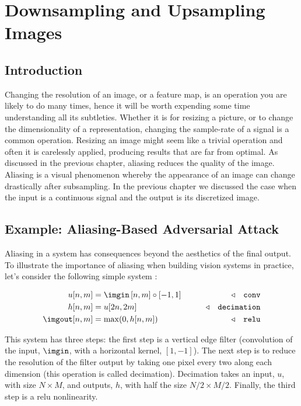 \chapter{Downsampling and Upsampling Images}
\label{chap:downsampling_and_upsampling}

\newcommand{\imghidden}{\ell_{\texttt{hidden}}}


\section{Introduction}

Changing the resolution of an image, or a feature map, is an operation you are likely to do many times, hence it will be worth expending some time understanding all its subtleties. Whether it is for resizing a picture, or to change the dimensionality of a representation, changing the sample-rate of a signal is a common operation. Resizing an image might seem like a trivial operation and often it is carelessly applied, producing results that are far from optimal. As discussed in the previous chapter, aliasing reduces the quality of the image. Aliasing is a visual phenomenon whereby the appearance of an image can change drastically after subsampling. In the previous chapter we discussed the case when the input is a continuous signal and the output is its discretized image.


\section{Example: Aliasing-Based Adversarial Attack}

Aliasing in a system has consequences beyond the aesthetics of the final output. To illustrate the importance of aliasing when building vision systems in practice, let's consider the following simple system \cite{rodríguezmuñoz2022aliasing}:

\begin{align}
	u[n,m]       & = \imgin \left[n,m\right] \circ \left[-1, 1 \right] & \quad\quad \triangleleft \quad \texttt{conv}       \\
	h[n,m]       & = u[2n,2m]                                          & \quad\quad \triangleleft \quad \texttt{decimation} \\
	\imgout[n,m] & = \max (0,h[n,m])                                   & \quad\quad \triangleleft \quad \texttt{relu}
\end{align}

This system has three steps: the first step is a vertical edge filter (convolution of the input, $\imgin$, with a horizontal kernel, $[1, -1]$). The next step is to reduce the resolution of the filter output by taking one pixel every two along each dimension (this operation is called decimation). Decimation takes an input, $u$, with size $N\times M$, and outputs, $h$, with half the size $N/2 \times M/2$.
Finally, the third step is a relu nonlinearity.

